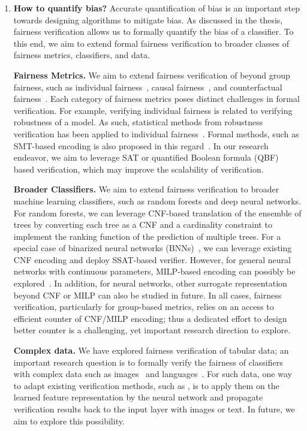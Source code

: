 \begin{itemize}
\begin{enumerate}
		\item \textbf{How to quantify bias?} Accurate quantification of bias is an important step towards designing algorithms to mitigate bias. As discussed in the thesis, fairness verification allows us to formally quantify the bias of a classifier. To this end, we aim to extend formal fairness verification to broader classes of fairness metrics, classifiers, and data. 
		
		
		\textbf{Fairness Metrics.} We aim to extend fairness verification of beyond group fairness, such as individual fairness~\cite{john2020verifying}, causal fairness~\cite{pan2021explaining,zhang2018fairness}, and counterfactual fairness~\cite{wu2019counterfactual,chiappa2019path}. Each category of fairness metrics poses distinct challenges in formal verification. For example, verifying individual fairness is related to verifying robustness of a model. As such, statistical methods from robustness verification has been applied to individual fairness~\cite{john2020verifying}. Formal methods, such as SMT-based encoding is also proposed in this regard~\cite{biswas2022fairify}. In our research endeavor, we aim to leverage  SAT or quantified Boolean formula (QBF) based verification, which may improve the scalability of verification.
		
		
		\textbf{Broader Classifiers.} We aim to extend fairness verification to broader machine learning classifiers, such as random forests and deep neural networks. For random forests, we can leverage CNF-based translation of the ensemble of trees by converting each tree as a CNF and a cardinality constraint to implement the ranking function of the prediction of multiple trees. For a special case of binarized neural networks (BNNs)~\cite{hubara2016binarized}, we can leverage existing CNF encoding and deploy SSAT-based verifier. However, for general neural networks with continuous parameters, MILP-based encoding can possibly be explored~\cite{mistry2022milp}. In addition, for neural networks, other surrogate representation beyond CNF or MILP can also be studied in future. In all cases, fairness verification, particularly for group-based metrics, relies on an access to efficient counter of CNF/MILP encoding; thus a dedicated effort to design better counter is a challenging, yet important research direction to explore.
		
		
		\textbf{Complex data.} We have explored fairness verification of tabular data; an important research question is to formally verify the fairness of classifiers with complex data such as images~\cite{nuriel2021permuted} and languages~\cite{abid2021persistent,nadeem2020stereoset,vig2020investigating}. For such data, one way to adapt existing verification methods, such as {\justicia}, is to apply them on the learned feature representation by the neural network and propagate verification results back to the input layer with images or text. In future, we aim to explore this possibility.
		

\end{enumerate}
\end{itemize}
